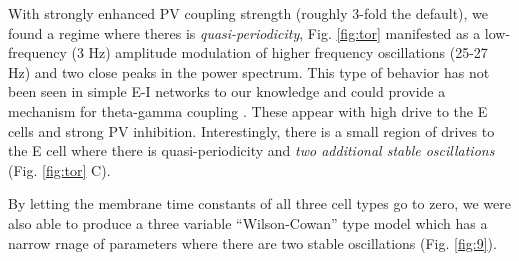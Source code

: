 \documentclass[10pt,letterpaper]{article}
\begin{document}
With strongly enhanced PV coupling strength (roughly 3-fold the default), we found a regime where theres is {\em quasi-periodicity}, Fig. \ref{fig:tor} manifested as a low-frequency (3 Hz) amplitude modulation of higher frequency oscillations (25-27 Hz) and two close peaks in the power spectrum.  This type of behavior has not been seen in simple E-I networks to our knowledge and could provide a mechanism for theta-gamma coupling \cite{lisman2013}.  These appear with high drive to the E cells and strong PV  inhibition. Interestingly, there is a small region of drives to the E cell where there is quasi-periodicity and {\em two additional stable oscillations} (Fig. \ref{fig:tor} C).

By letting the membrane time constants of all three cell types go to zero, we were also able to produce a three variable ``Wilson-Cowan'' type model which has a narrow rnage of parameters where there are two stable oscillations (Fig. \ref{fig:9}).
\end{document}
